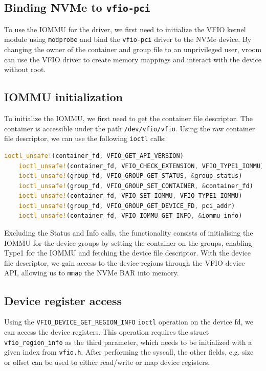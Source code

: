 \subsection{Binding NVMe to \texttt{vfio-pci}}\label{sec:bindvfiopci}
To use the IOMMU for the driver, we first need to initialize the VFIO kernel module using \texttt{modprobe} and bind the \texttt{vfio-pci} driver to the NVMe device. By changing the owner of the container and group file to an unprivileged user, vroom can use the VFIO driver to create memory mappings and interact with the device without root.

\subsection{IOMMU initialization}\label{sec:iommuinit}
To initialize the IOMMU, we first need to get the container file descriptor. The container is accessible under the path \texttt{/dev/vfio/vfio}. Using the raw container file descriptor, we can use the following \texttt{ioctl} calls:

\begin{lstlisting}[language=Rust, caption={\texttt{ioctl} calls needed for IOMMU initialization}, label=lst:containerioctls]
    ioctl_unsafe!(container_fd, VFIO_GET_API_VERSION)
    ioctl_unsafe!(container_fd, VFIO_CHECK_EXTENSION, VFIO_TYPE1_IOMMU)
    ioctl_unsafe!(group_fd, VFIO_GROUP_GET_STATUS, &group_status)
    ioctl_unsafe!(group_fd, VFIO_GROUP_SET_CONTAINER, &container_fd)
    ioctl_unsafe!(container_fd, VFIO_SET_IOMMU, VFIO_TYPE1_IOMMU)
    ioctl_unsafe!(group_fd, VFIO_GROUP_GET_DEVICE_FD, pci_addr)
    ioctl_unsafe!(container_fd, VFIO_IOMMU_GET_INFO, &iommu_info)   
\end{lstlisting}

Excluding the Status and Info calls, the functionality consists of initialising the IOMMU for the device groups by setting the container on the groups, enabling Type1 for the IOMMU and fetching the device file descriptor. With the device file descriptor, we gain access to the device regions through the VFIO device API, allowing us to \texttt{mmap} the NVMe BAR into memory.

\subsection{Device register access}\label{sec:pcieconfig}
Using the \texttt{VFIO\_DEVICE\_GET\_REGION\_INFO} \texttt{ioctl} operation on the device fd, we can access the device registers. This operation requires the struct \texttt{vfio\_region\_info} as the third parameter, which needs to be initialized with a given index from \texttt{vfio.h}. After performing the syscall, the other fields, e.g. size or offset can be used to either read/write or map device registers.

